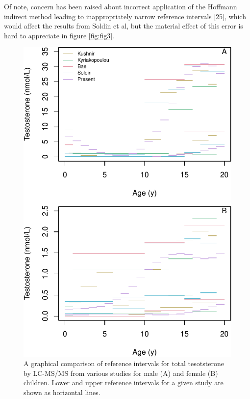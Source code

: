 \documentclass[]{elsarticle} %
\begin{document}
Of note, concern has been raised about incorrect application of the
Hoffmann indirect method leading to inappropriately narrow reference
intervals {[}25{]}, which would affect the results from Soldin et al,
but the material effect of this error is hard to appreciate in figure
\ref{fig:fig3}.

\begin{figure}[H]
\includegraphics{comparisonfig3-1} \caption{\label{fig:fig3}A graphical comparison of reference intervals for total tesotsterone by LC-MS/MS from various studies for male (A) and female (B) children. Lower and upper reference intervals for a given study are shown as horizontal lines.}\label{fig:comparisonfig3}
\end{figure}
\end{document}
